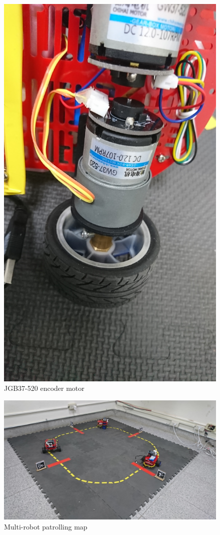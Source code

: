 \documentclass[letterpaper, 10 pt, conference]{ieeeconf}  %
\begin{document}
\begin{figure}[h] %
\includegraphics[width=0.8\columnwidth]{JGB37-520}
\centering
\caption{JGB37-520 encoder motor}
 \label{figure:JGB37-520}
\end{figure}

\begin{figure}[t] %
\includegraphics[width=0.8\columnwidth]{map}
\centering
\caption{Multi-robot patrolling map}
\label{figure:map}
\end{figure}
\end{document}
